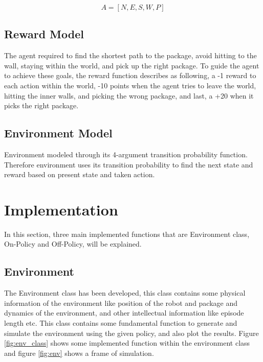 \documentclass[lettersize,journal]{IEEEtran}
\begin{document}
\begin{equation}
A = [N, E, S, W, P]
\end{equation}


\subsection{Reward Model}
The agent required to find the shortest path to the package, avoid hitting to the wall, staying within the world, and pick up the right package. To guide the agent to achieve these goals, the reward function describes as following, a -1 reward to each action within the world, -10 points when the agent tries to leave the world, hitting the inner walls, and picking the wrong package, and last, a +20 when it picks the right package. 


\subsection{Environment Model}
Environment modeled through its 4-argument transition probability function. Therefore environment uses its transition probability to find the next state and reward based on present state and taken action.  


\section{Implementation}
In this section, three main implemented functions that are Environment class, On-Policy and Off-Policy, will be explained.



\subsection{Environment}
The Environment class has been developed, this class contains some physical information of the environment like position of the robot and package and dynamics of the environment, and other intellectual information like episode length etc. This class contains some fundamental function to generate and simulate the environment using the given policy, and also plot the results. Figure \ref{fig:env_class} shows some implemented function within the environment class and figure \ref{fig:env} shows a frame of simulation.
\end{document}
